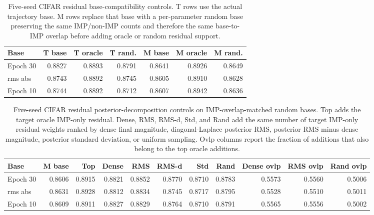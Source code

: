 \begin{table}[t]
\centering
\small
\setlength{\tabcolsep}{2.5pt}
\begin{tabular}{lrrrrrr}
\toprule
Base & T base & T oracle & T rand. & M base & M oracle & M rand. \\
\midrule
Epoch 30 & 0.8827 & 0.8893 & 0.8791 & 0.8641 & 0.8926 & 0.8649 \\
rms abs & 0.8743 & 0.8892 & 0.8745 & 0.8605 & 0.8910 & 0.8628 \\
Epoch 10 & 0.8744 & 0.8892 & 0.8712 & 0.8607 & 0.8942 & 0.8636 \\
\bottomrule
\end{tabular}
\caption{Five-seed CIFAR residual base-compatibility controls. T rows use the actual trajectory base. M rows replace that base with a per-parameter random base preserving the same IMP/non-IMP counts and therefore the same base-to-IMP overlap before adding oracle or random residual support.}
\label{tab:cifar-residual-base-compatibility}
\end{table}

\begin{table}[t]
\centering
\small
\setlength{\tabcolsep}{1.8pt}
\begin{tabular}{lrrrrrrrrrr}
\toprule
Base & M base & Top & Dense & RMS & RMS-d & Std & Rand & Dense ovlp & RMS ovlp & Rand ovlp \\
\midrule
Epoch 30 & 0.8606 & 0.8915 & 0.8821 & 0.8852 & 0.8770 & 0.8710 & 0.8783 & 0.5573 & 0.5560 & 0.5006 \\
rms abs & 0.8631 & 0.8928 & 0.8812 & 0.8834 & 0.8745 & 0.8717 & 0.8795 & 0.5528 & 0.5510 & 0.5011 \\
Epoch 10 & 0.8609 & 0.8911 & 0.8827 & 0.8829 & 0.8764 & 0.8710 & 0.8791 & 0.5565 & 0.5556 & 0.5002 \\
\bottomrule
\end{tabular}
\caption{Five-seed CIFAR residual posterior-decomposition controls on IMP-overlap-matched random bases. Top adds the target oracle IMP-only residual. Dense, RMS, RMS-d, Std, and Rand add the same number of target IMP-only residual weights ranked by dense final magnitude, diagonal-Laplace posterior RMS, posterior RMS minus dense magnitude, posterior standard deviation, or uniform sampling. Ovlp columns report the fraction of additions that also belong to the top oracle additions.}
\label{tab:cifar-residual-base-ordering}
\end{table}

